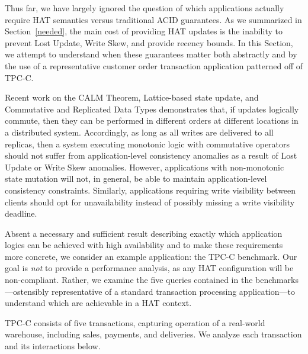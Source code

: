 Thus far, we have largely ignored the question of which applications
actually require HAT semantics versus traditional ACID guarantees. As
we summarized in Section~\ref{needed}, the main cost of providing HAT
updates is the inability to prevent Lost Update, Write Skew, and
provide recency bounds. In this Section, we attempt to understand when
these guarantees matter both abstractly and by the use of a
representative customer order transaction application patterned off of
TPC-C.

Recent work on the CALM Theorem, Lattice-based state update, and
Commutative and Replicated Data Types demonstrates that, if updates
logically commute, then they can be performed in different orders at
different locations in a distributed system. Accordingly, as long as
all writes are delivered to all replicas, then a system executing
monotonic logic with commutative operators should not suffer from
application-level consistency anomalies as a result of Lost Update or
Write Skew anomalies. However, applications with non-monotonic state
mutation will not, in general, be able to maintain application-level
consistency constraints. Similarly, applications requiring
write visibility between clients should opt for unavailability instead
of possibly missing a write visibility deadline.

Absent a necessary and sufficient result describing exactly which
application logics can be achieved with high availability and to make
these requirements more concrete, we consider an example application:
the TPC-C benchmark. Our goal is \textit{not} to provide a performance
analysis, as any HAT configuration will be non-compliant. Rather, we
examine the five queries contained in the benchmarks---ostensibly
representative of a standard transaction processing application---to
understand which are achievable in a HAT context.

TPC-C consists of five transactions, capturing operation of a
real-world warehouse, including sales, payments, and deliveries. We
analyze each transaction and its interactions below.

